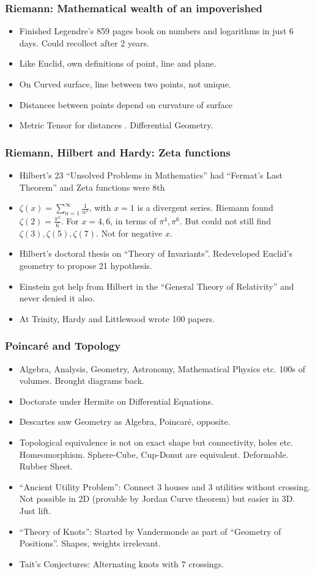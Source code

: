 \begin{frame}[fragile]
\frametitle{Riemann: Mathematical wealth of an impoverished}
\begin{itemize}
\item Finished Legendre's 859 pages book on numbers and logarithms in just 6 days. Could recollect after 2 years.
\item Like Euclid, own definitions of point, line and plane.
\item On Curved surface, line between two points, not unique.
\item Distances between points depend on curvature of surface
\item Metric Tensor for distances . Differential Geometry. 
\end{itemize}
\end{frame}


\begin{frame}[fragile]
\frametitle{Riemann, Hilbert and Hardy: Zeta functions}
\begin{itemize}
\item Hilbert's 23 ``Unsolved Problems in Mathematics'' had ``Fermat's Last Theorem'' and Zeta functions were 8th
\item $\zeta(x) = \sum \limits_{n = 1}^{\infty} \frac{1}{n^x}$, with $x=1$ is a divergent series. Riemann found $\zeta (2) = \frac{\pi^2}{6}$. For $x=4,6$, in terms of $\pi^4, \pi^6$. But could not still find $\zeta (3),\zeta (5),\zeta (7)$. Not for negative $x$.
\item Hilbert's doctoral thesis on ``Theory of Invariants''. Redeveloped Euclid's geometry to propose 21 hypothesis. 
\item Einstein got help from Hilbert in the ``General Theory of Relativity'' and never denied it also.
\item At Trinity, Hardy and Littlewood wrote 100 papers.
\end{itemize}
\end{frame}


\begin{frame}[fragile]
\frametitle{Poincar\'e and Topology}
\begin{itemize}
\item Algebra, Analysis, Geometry, Astronomy, Mathematical Physics etc. 100s of volumes. Brought diagrams back.
\item Doctorate under Hermite on Differential Equations.
\item Descartes saw Geometry as Algebra, Poincar\'e, opposite.
\item Topological equivalence is not on exact shape but connectivity, holes etc. Homeomorphism. Sphere-Cube, Cup-Donut are equivalent. Deformable. Rubber Sheet.
\item ``Ancient Utility Problem'': Connect 3 houses and 3 utilities without crossing. Not possible in 2D (provable by Jordan Curve theorem) but easier in 3D. Just lift.
\item ``Theory of Knots'': Started by Vandermonde as part of ``Geometry of Positions''. Shapes, weights irrelevant.
\item Tait's Conjectures: Alternating knots with 7 crossings.
\end{itemize}
\end{frame}


